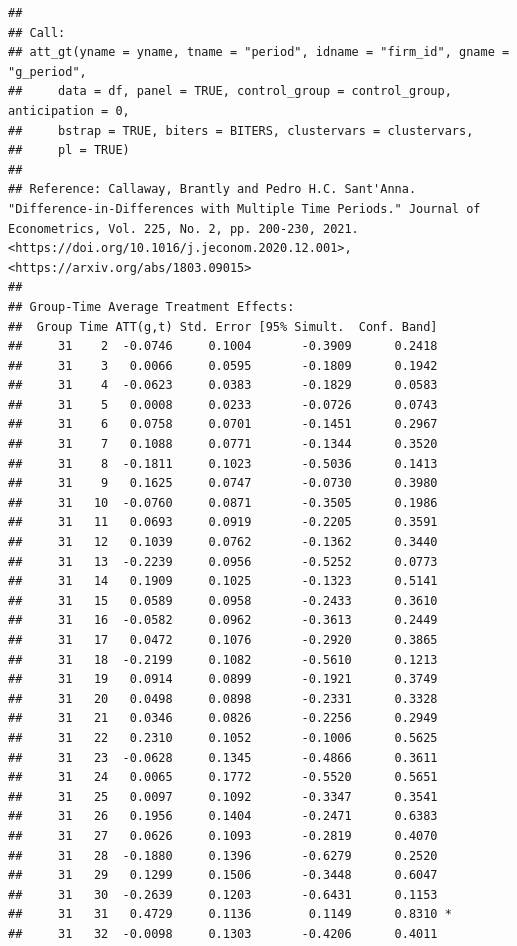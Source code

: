 \documentclass[
]{article}
\begin{document}
\begin{verbatim}
## 
## Call:
## att_gt(yname = yname, tname = "period", idname = "firm_id", gname = "g_period", 
##     data = df, panel = TRUE, control_group = control_group, anticipation = 0, 
##     bstrap = TRUE, biters = BITERS, clustervars = clustervars, 
##     pl = TRUE)
## 
## Reference: Callaway, Brantly and Pedro H.C. Sant'Anna.  "Difference-in-Differences with Multiple Time Periods." Journal of Econometrics, Vol. 225, No. 2, pp. 200-230, 2021. <https://doi.org/10.1016/j.jeconom.2020.12.001>, <https://arxiv.org/abs/1803.09015> 
## 
## Group-Time Average Treatment Effects:
##  Group Time ATT(g,t) Std. Error [95% Simult.  Conf. Band]  
##     31    2  -0.0746     0.1004       -0.3909      0.2418  
##     31    3   0.0066     0.0595       -0.1809      0.1942  
##     31    4  -0.0623     0.0383       -0.1829      0.0583  
##     31    5   0.0008     0.0233       -0.0726      0.0743  
##     31    6   0.0758     0.0701       -0.1451      0.2967  
##     31    7   0.1088     0.0771       -0.1344      0.3520  
##     31    8  -0.1811     0.1023       -0.5036      0.1413  
##     31    9   0.1625     0.0747       -0.0730      0.3980  
##     31   10  -0.0760     0.0871       -0.3505      0.1986  
##     31   11   0.0693     0.0919       -0.2205      0.3591  
##     31   12   0.1039     0.0762       -0.1362      0.3440  
##     31   13  -0.2239     0.0956       -0.5252      0.0773  
##     31   14   0.1909     0.1025       -0.1323      0.5141  
##     31   15   0.0589     0.0958       -0.2433      0.3610  
##     31   16  -0.0582     0.0962       -0.3613      0.2449  
##     31   17   0.0472     0.1076       -0.2920      0.3865  
##     31   18  -0.2199     0.1082       -0.5610      0.1213  
##     31   19   0.0914     0.0899       -0.1921      0.3749  
##     31   20   0.0498     0.0898       -0.2331      0.3328  
##     31   21   0.0346     0.0826       -0.2256      0.2949  
##     31   22   0.2310     0.1052       -0.1006      0.5625  
##     31   23  -0.0628     0.1345       -0.4866      0.3611  
##     31   24   0.0065     0.1772       -0.5520      0.5651  
##     31   25   0.0097     0.1092       -0.3347      0.3541  
##     31   26   0.1956     0.1404       -0.2471      0.6383  
##     31   27   0.0626     0.1093       -0.2819      0.4070  
##     31   28  -0.1880     0.1396       -0.6279      0.2520  
##     31   29   0.1299     0.1506       -0.3448      0.6047  
##     31   30  -0.2639     0.1203       -0.6431      0.1153  
##     31   31   0.4729     0.1136        0.1149      0.8310 *
##     31   32  -0.0098     0.1303       -0.4206      0.4011  

\end{verbatim}
\end{document}
